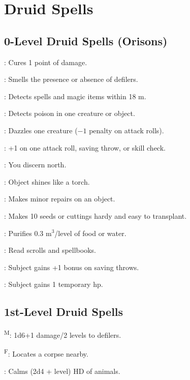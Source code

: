 \section{Druid Spells}



\subsection{0-Level Druid Spells (Orisons)}


: Cures 1 point of damage.

: Smells the presence or absence of defilers. %

: Detects spells and magic items within 18 m.

: Detects poison in one creature or object.

: Dazzles one creature ($-1$ penalty on attack rolls).

: +1 on one attack roll, saving throw, or skill check.

: You discern north.

: Object shines like a torch.

: Makes minor repairs on an object.

: Makes 10 seeds or cuttings hardy and easy to transplant.

: Purifies 0.3 m$^3$/level of food or water.

: Read scrolls and spellbooks.

: Subject gains +1 bonus on saving throws.

: Subject gains 1 temporary hp.



\subsection{1st-Level Druid Spells}

\textsuperscript{M}: 1d6+1 damage/2 levels to defilers. %

\textsuperscript{F}: Locates a corpse nearby.

: Calms (2d4 + level) HD of animals.

